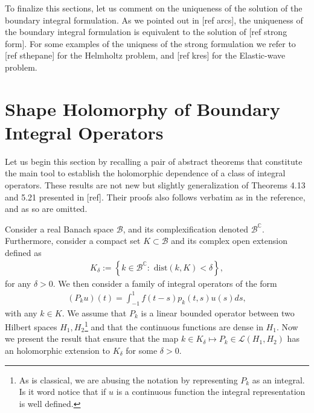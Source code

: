 \documentclass{article}
\newcommand{\todo}[1]{{\color{red}[#1]}}
\newcommand{\IC}{{\mathbb C}}
\begin{document}
To finalize this sections, let us comment on the uniqueness of the solution of the boundary integral formulation. As we pointed out in \todo{ref arcs}, the uniqueness of the boundary integral formulation is equivalent to the solution of \todo{ref strong form}. For some examples of the uniqness of the strong formulation we refer to \todo{ref sthepane} for the Helmholtz problem, and \todo{ref kres} for the Elastic-wave problem.
\section{Shape Holomorphy of Boundary Integral Operators}

Let us begin this section by recalling a pair of abstract theorems that constitute the main tool to establish the holomorphic dependence of a class of integral operators. These results are not new but slightly generalization of  Theorems 4.13 and 5.21 presented in \todo{ref}. Their proofs also follows verbatim as in the reference, and as so are omitted.

Consider a real Banach space $\mathcal{B}$, and its complexification denoted $\mathcal{B}^{\IC}$. Furthermore, consider a compact set $K \subset \mathcal{B}$ and its complex open extension defined as 
\begin{align}
\label{eq:openext}
K_\delta :=  \left\lbrace k \in \mathcal{B}^{\IC} : \text{ dist}(k, K) < \delta \right\rbrace,
\end{align}
for any $\delta>0$. We then consider a family of integral operators of the form
\begin{align*}
(P_k u)(t) = \int_{-1}^{1} f(t-s) p_k(t,s) u(s) ds,
\end{align*}
with any $k \in K$. We assume that $P_k$ is a linear bounded operator between two Hilbert spaces $H_1,H_2$\footnote{As is classical, we are abusing the notation by representing $P_k$ as an integral. Is it word notice that if $u$ is a continuous function the integral representation is well defined.} and that the continuous functions are dense in $H_1$. Now we present the result that ensure that the map $k \in K_\delta \mapsto P_k \in \mathcal{L}(H_1,H_2)$ has an holomorphic extension to $K_\delta$ for some $\delta>0$. 
\end{document}
